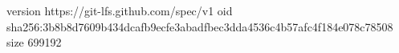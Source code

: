 version https://git-lfs.github.com/spec/v1
oid sha256:3b8b8d7609b434dcafb9ecfe3abadfbec3dda4536c4b57afc4f184e078c78508
size 699192
